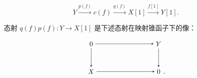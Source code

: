 \begin{equation}
  Y\xrightarrow{p(f)}c(f)\xrightarrow{q(f)}X[1]
  \xrightarrow{f[1]}Y[1].
  \tag{3.2.5.1}
\end{equation}

态射 $q(f)p(f)\colon Y\longrightarrow X[1]$ 是下述态射在映射锥函子下的像：

\begin{equation*}
  \begin{tikzpicture}[>=stealth,baseline=(current bounding box.center)]
    \node (Z1) at (0,1.45) {$0$};
    \node (Y)  at (3.5,1.45) {$Y$};
    \node (X)  at (0,0) {$X$};
    \node (Z2) at (3.5,0) {$0$};
    \node[anchor=base west,inner sep=0pt,xshift=.08em] at (Z2.base east) {$.$};
    \draw[->] (Z1) -- (Y);
    \draw[->] (Z1) -- (X);
    \draw[->] (Y) -- (Z2);
    \draw[->] (X) -- (Z2);
  \end{tikzpicture}
\end{equation*}
